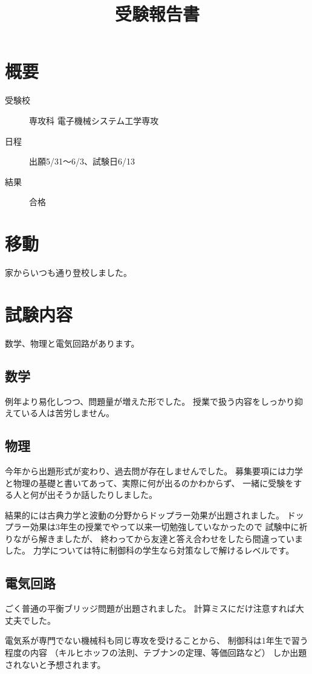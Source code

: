 \documentclass[]{jsarticle}
\title{受験報告書}
\date{}
\begin{document}
\maketitle
\section*{概要}
    \begin{description}
        \item[受験校] 専攻科 電子機械システム工学専攻
        \item[日程] 出願5/31〜6/3、試験日6/13
        \item[結果] 合格
    \end{description}
\section*{移動}
    家からいつも通り登校しました。
\section*{試験内容}
    数学、物理と電気回路があります。
    \subsection*{数学}
        例年より易化しつつ、問題量が増えた形でした。
        授業で扱う内容をしっかり抑えている人は苦労しません。
    \subsection*{物理}
        今年から出題形式が変わり、過去問が存在しませんでした。
        募集要項には力学と物理の基礎と書いてあって、実際に何が出るのかわからず、
        一緒に受験をする人と何が出そうか話したりしました。

        結果的には古典力学と波動の分野からドップラー効果が出題されました。
        ドップラー効果は3年生の授業でやって以来一切勉強していなかったので
        試験中に祈りながら解きましたが、
        終わってから友達と答え合わせをしたら間違っていました。
        力学については特に制御科の学生なら対策なしで解けるレベルです。
    \subsection*{電気回路}
        ごく普通の平衡ブリッジ問題が出題されました。
        計算ミスにだけ注意すれば大丈夫でした。

        電気系が専門でない機械科も同じ専攻を受けることから、
        制御科は1年生で習う程度の内容
        （キルヒホッフの法則、テブナンの定理、等価回路など）
        しか出題されないと予想されます。
\end{document}
